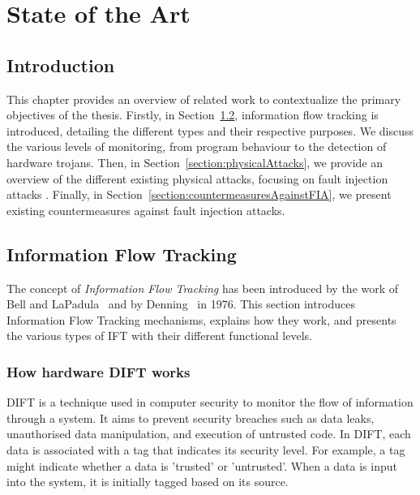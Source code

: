 \chapter{State of the Art}
\label{chapter:soa}
\minitoc

\section{Introduction}
This chapter provides an overview of related work to contextualize the primary objectives of the thesis. Firstly, in Section~\ref{section:ift}, information flow tracking is introduced, detailing the different types and their respective purposes. We discuss the various levels of monitoring, from program behaviour to the detection of hardware trojans.
Then, in Section~\ref{section:physicalAttacks}, we provide an overview of the different existing physical attacks, focusing on fault injection attacks .
Finally, in Section~\ref{section:countermeasuresAgainstFIA}, we present existing countermeasures against fault injection attacks.

\section{Information Flow Tracking}
\label{section:ift}
The concept of \textit{Information Flow Tracking} has been introduced by the work of Bell and LaPadula~\cite{BLP-76-military} and by Denning~\cite{D-76-commacm} in 1976.
This section introduces Information Flow Tracking mechanisms, explains how they work, and presents the various types of IFT with their different functional levels.

\subsection{How hardware DIFT works}
DIFT is a technique used in computer security to monitor the flow of information through a system. It aims to prevent security breaches such as data leaks, unauthorised data manipulation, and execution of untrusted code. In DIFT, each data is associated with a tag that indicates its security level.
For example, a tag might indicate whether a data is 'trusted' or 'untrusted'. When a data is input into the system, it is initially tagged based on its source.

